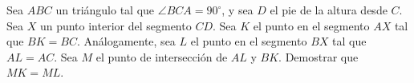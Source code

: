 Sea $ABC$ un triángulo tal que $\angle BCA = 90^{\circ}$, y sea $D$ el pie de la altura desde $C$. Sea $X$ un punto interior del segmento $CD$. Sea $K$ el punto en el segmento $AX$ tal que $BK = BC$. Análogamente, sea $L$ el punto en el segmento $BX$ tal que $AL = AC$. Sea $M$ el punto de intersección de $AL$ y $BK$. \newline 
Demostrar que $MK = ML$.
